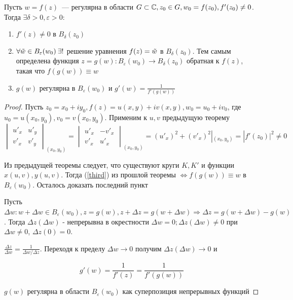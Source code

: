 \begin{theorem}
    Пусть $w=f(z)$~--- регулярна в области $G \subset \mathbb{C}, z_0 \in G, w_0=f(z_0), f'(z_0) \neq 0$. Тогда $\exists \delta >0, \varepsilon >0:$
    \begin{enumerate}
        \item $f'(z) \neq 0$ в $B_\delta(z_0)$
        \item $\forall \Tilde{w} \in B_\varepsilon(w_0) \: \exists !$ решение уравнения $f(z)=\Tilde{w}$ в $B_\delta(z_0)$. Тем самым определена функция $z=g(w): B_\varepsilon(w_0) \rightarrow B_\delta(z_0)$ обратная к $f(z)$, такая что $f(g(w))\equiv w$
        \item $g(w)$ регулярна в $B_\varepsilon(w_0)$ и $g'(w)=\frac{1}{f'(g(w))}$
    \end{enumerate}
\end{theorem}

\begin{proof}
    Пусть $z_0=x_0+iy_0, f(z)=u(x,y)+iv(x,y), w_0=u_0+iv_0$, где $u_0=u(x_0, y_0), v_0=v(x_0, y_0)$. Применим к $u, v$ предыдущую теорему
    \[\begin{vmatrix}
		u'_x & u'_y \\ v'_x & v'_y
    \end{vmatrix}_{(x_0, y_0)} = \begin{vmatrix}
		u'_x & -v'_x \\ v'_x & u'_x
    \end{vmatrix}_{(x_0,y_0)}=(u'_x)^2+(v'_x)^2|_{(x_0, y_0)}=|f'(z_0)|^2 \neq 0\]

    Из предыдущей теоремы следует, что существуют круги $K, K'$ и функции $x(u,v), y(u,v)$. Тогда (\ref{third}) из прошлой теоремы $\Leftrightarrow f(g(w))\equiv w$ в $B_\varepsilon(w_0)$. Осталось доказать последний пункт

    Пусть $\Delta w: w+\Delta w \in B_\varepsilon(w_0), z=g(w), z+\Delta z=g(w+\Delta w) \Rightarrow \Delta z=g(w+\Delta w)-g(w)$. Тогда $\Delta z(\Delta w)$ - непрерывна в окрестности $\Delta w=0; \Delta z(\Delta w) \neq 0$ при $\Delta w \neq 0$, $\Delta z(0)=0$.

    $\frac{\Delta z}{\Delta w}=\frac{1}{\Delta w / \Delta z}$. Переходя к пределу $\Delta w \rightarrow 0$ получим $\Delta z(\Delta w) \rightarrow 0$ и 

    \[ g'(w)=\frac{1}{f'(z)}=\frac{1}{f'(g(w))}\]

    $g(w)$ регулярна в области $B_\varepsilon(w_0)$ как суперпозиция непрерывных функций
\end{proof}
